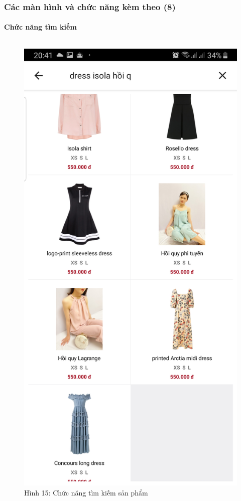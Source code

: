 \documentclass{beamer}
\begin{document}
\begin{frame}
    \frametitle{Các màn hình và chức năng kèm theo (8)}
    \framesubtitle{Chức năng tìm kiếm}

    \begin{columns}
        \begin{figure}
            \centering
            \includegraphics[height=0.7\textheight]{images/09.png}
            \caption{\centering\tiny{Hình 15: Chức năng tìm kiếm sản phẩm}}


\end{figure}
\end{columns}
\end{frame}
\end{document}
